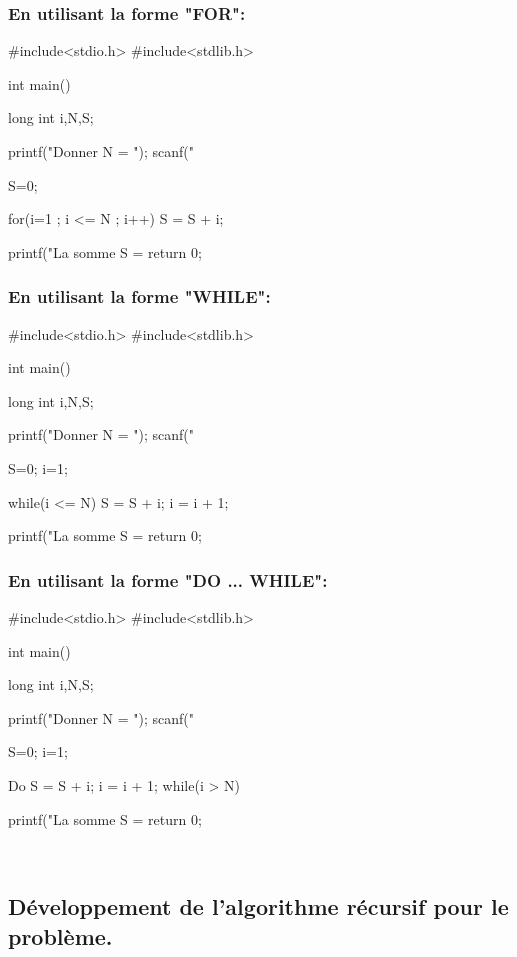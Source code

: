 \documentclass[•]{article}
\begin{document}
\subsubsection{En utilisant la forme "FOR":}
\begin{sql}
 #include<stdio.h>
 #include<stdlib.h> 
 
 int main()
 {
	long int i,N,S;
	
	printf("Donner N = ");
	scanf("%
	
	S=0;
	
	for(i=1 ; i <= N ; i++)
	{
		S = S + i;
	}
	
	printf("La somme S = %
	return 0;
 }
\end{sql}

\subsubsection{En utilisant la forme "WHILE":}
\begin{sql}
 #include<stdio.h>
 #include<stdlib.h>
 
 int main()
 {
	long int i,N,S;
	
	printf("Donner N = ");
	scanf("%
	
	S=0; i=1;
	
	while(i <= N)
	{
		S = S + i;
		i = i + 1;
	}
	
	printf("La somme S = %
	return 0;
 }
\end{sql}

\subsubsection{En utilisant la forme "DO ... WHILE":}
\begin{sql}
 #include<stdio.h>
 #include<stdlib.h>
 
 int main()
 {
	long int i,N,S;
	
	printf("Donner N = ");
	scanf("%
	
	S=0; i=1;
	
	Do
	{
		S = S + i;
		i = i + 1;
	}while(i > N)
	
	printf("La somme S = %
	return 0;
 }
\end{sql}
\textrm{ }
\\

\subsection{Développement de l'algorithme récursif pour le problème.}
\end{document}

